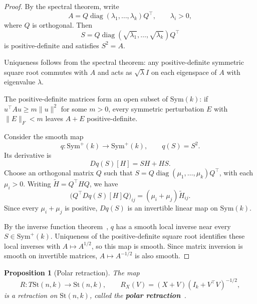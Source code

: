 \documentclass[12pt]{article}
\theoremstyle{definition}
\theoremstyle{plain}
\newtheorem{proposition}[definition]{Proposition}
\theoremstyle{remark}
\newcommand{\St}{\mathrm{St} (n,k)}
\newcommand{\Sym}{\mathrm{Sym}}              %
\DeclareMathOperator{\diag}{diag}
\begin{document}
\begin{proof}

  By the spectral theorem, write
  \[
    A = Q\diag(\lambda_1,\dots,\lambda_k)Q^\top, \qquad \lambda_i > 0,
  \]
  where \( Q \) is orthogonal.
  Then
  \[
    S = Q \diag( \sqrt{ \lambda_1 }, \dots, \sqrt{ \lambda_k }) Q^\top
  \]
  is positive-definite and satisfies \( S^2 = A \).

  Uniqueness follows from the spectral theorem: any positive-definite symmetric square root commutes with \( A \) and acts as \( \sqrt{\lambda}I \) on each eigenspace of \( A \) with eigenvalue \( \lambda \).

  The positive-definite matrices form an open subset of \( \Sym(k) \): if \( u^\top Au\ge m\|u\|^2 \) for some \( m>0 \), every symmetric perturbation \( E \) with \( \|E\|_F<m \) leaves \( A+E \) positive-definite.

  Consider the smooth map
  \[
    q : \Sym^+(k) \longrightarrow \Sym^+(k), \qquad q(S) = S^2.
  \]
  Its derivative is
  \[
    Dq(S)[H] = SH + HS.
  \]
  Choose an orthogonal matrix \( Q \) such that
  \( S = Q \diag( \mu_1, \dots, \mu_k)Q^\top \), with each \( \mu_i > 0 \). Writing \( \widetilde{H} = Q^\top H Q \),
  we have
  \[
    \bigl(Q^\top Dq(S)[H]Q\bigr)_{ij} = (\mu_i+\mu_j)\widetilde{H}_{ij}.
  \]
  Since every \( \mu_i+\mu_j \) is positive, \( Dq(S) \) is an invertible linear map on \( \Sym(k) \).

  By the inverse function theorem~\cite[Theorem 3.9]{segal}, \( q \) has a smooth local inverse near every \( S \in \Sym^+(k) \).
  Uniqueness of the positive-definite square root identifies these local inverses with \( A \mapsto A^{1/2} \), so this map is smooth.
  Since matrix inversion is smooth on invertible matrices, \( A \mapsto A^{-1/2} \) is also smooth.
\end{proof}

\begin{proposition}[Polar retraction]\label{prop:stiefel-polar-retraction}
  The map
  \[
    R : T\St \longrightarrow \St, \qquad R_X(V) = (X+V)(I_k+V^\top V)^{-1/2},
  \]
  is a retraction on \( \St \), called the \textbf{polar retraction}~\cite[Section 7.3, equation (7.24)]{boumal}.
\end{proposition}
\end{document}
